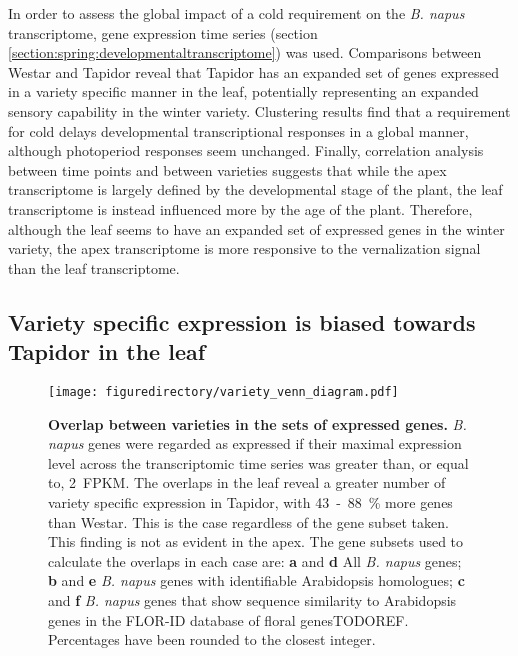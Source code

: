 \documentclass[12pt,]{book}
\begin{document}
In order to assess the global impact of a cold requirement on the
\emph{B. napus} transcriptome, gene expression time series (section
\ref{section:spring:developmentaltranscriptome}) was used. Comparisons
between Westar and Tapidor reveal that Tapidor has an expanded set of
genes expressed in a variety specific manner in the leaf, potentially
representing an expanded sensory capability in the winter variety.
Clustering results find that a requirement for cold delays developmental
transcriptional responses in a global manner, although photoperiod
responses seem unchanged. Finally, correlation analysis between time
points and between varieties suggests that while the apex transcriptome
is largely defined by the developmental stage of the plant, the leaf
transcriptome is instead influenced more by the age of the plant.
Therefore, although the leaf seems to have an expanded set of expressed
genes in the winter variety, the apex transcriptome is more responsive
to the vernalization signal than the leaf transcriptome.

\subsection{Variety specific expression is biased towards Tapidor in the
leaf}\label{section:winter:varspecexp}

\begin{figure}[htbp]
\centering
\texttt{[image: figuredirectory/variety\_venn\_diagram.pdf]}
\caption{\textbf{Overlap between varieties in the sets of expressed
genes.} \emph{B. napus} genes were regarded as expressed if their
maximal expression level across the transcriptomic time series was
greater than, or equal to, 2~FPKM. The overlaps in the leaf reveal a
greater number of variety specific expression in Tapidor, with
43~-~88~\% more genes than Westar. This is the case regardless of the
gene subset taken. This finding is not as evident in the apex. The gene
subsets used to calculate the overlaps in each case are: \textbf{a} and
\textbf{d} All \emph{B. napus} genes; \textbf{b} and \textbf{e} \emph{B.
napus} genes with identifiable Arabidopsis homologues; \textbf{c} and
\textbf{f} \emph{B. napus} genes that show sequence similarity to
Arabidopsis genes in the FLOR-ID database of floral genesTODOREF.
Percentages have been rounded to the closest
integer.}\label{figure:3xx:varietyvenn}
\end{figure}
\end{document}
